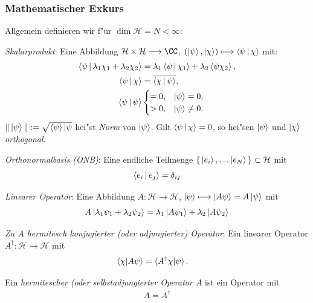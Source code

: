 \documentclass[a4paper]{scrartcl}
\begin{document}
{\subsubsection*{Mathematischer Exkurs}
Allgemein definieren wir f"ur $\dim \mathcal H = N < \infty$:
\begin{1aufz}
\item \emph{Skalarprodukt}:  Eine Abbildung $\mathcal H \times \mathcal H \longrightarrow \CC$, $( \Ket{ \psi }, \Ket{ \chi} ) \longmapsto \Braket{ \psi | \chi}$ mit:
\begin{align}
\Braket{\psi | \lambda_1 \chi_1 + \lambda_2 \chi_2} & = \lambda_1 \Braket{ \psi | \chi_1} + \lambda_2 \Braket{\psi  \chi_2}, \\
\Braket{ \psi | \chi }  & = \overline{ \Braket{ \chi | \psi }}, \\
\Braket{ \psi | \psi } & \begin{cases} = 0, &\Ket{ \psi } = 0, \\ > 0, & \Ket{\psi} \neq 0. \end{cases}
\end{align}
$\Vert \Ket{ \psi } \Vert := \sqrt{ \Braket \psi | \psi }$ hei"st \emph{Norm} von $\Ket{\psi}$.
Gilt $\Braket{\psi | \chi} = 0$, so hei"sen $\Ket \psi$ und $\Ket \chi$ \emph{orthogonal}.
\item \emph{Orthonormalbasis (ONB)}: Eine endliche Teilmenge $\set{ \Ket{e_i}, \ldots \Ket{e_N} } \subset \mathcal H$ mit
\begin{align}
\Braket{e_i | e_j} = \delta_{ij}
\end{align}
\item \emph{Linearer Operator}: Eine Abbildung $A: \mathcal H \longrightarrow \mathcal H$, $\Ket{\psi } \longmapsto \Ket{ A \psi } = A \Ket{ \psi}$ mit
\begin{align}
A \Ket{ \lambda_1 \psi_1 + \lambda_2 \psi_2} = \lambda_1 \Ket{A \psi_1} + \lambda_2 \Ket{A \psi_2}
\end{align}
\item \emph{Zu $A$ hermitesch konjugierter (oder adjungierter) Operator}: Ein linearer Operator $A^\dagger: \mathcal H \longrightarrow \mathcal H$ mit
\begin{align}
\braket{ \chi | A \psi } & = \braket{ A^\dagger \chi | \psi }.
\end{align}
\item Ein \emph{hermitescher (oder selbstadjungierter Operator $A$} ist ein Operator mit 
\begin{align}A = A^\dagger\end{align}

\end{1aufz}}
\end{document}
